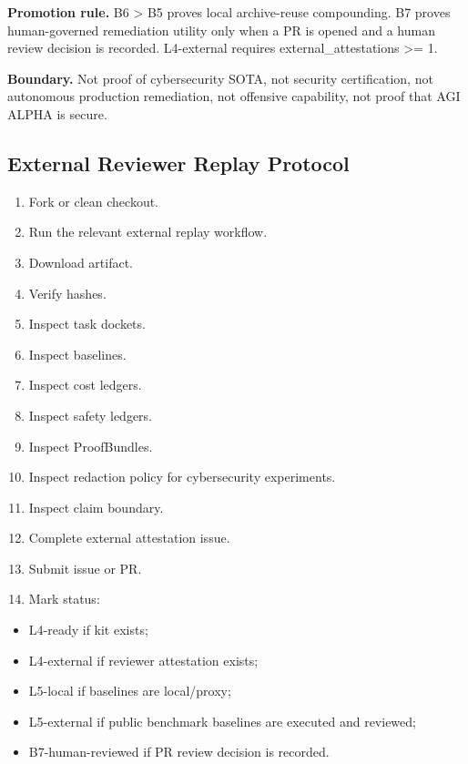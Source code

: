 \textbf{Promotion rule.} B6 \textgreater{} B5 proves local archive-reuse
compounding. B7 proves human-governed remediation utility only when a PR
is opened and a human review decision is recorded. L4-external requires
external\_attestations \textgreater= 1.

\textbf{Boundary.} Not proof of cybersecurity SOTA, not security
certification, not autonomous production remediation, not offensive
capability, not proof that AGI ALPHA is secure.

\subsection{External Reviewer Replay
Protocol}\label{external-reviewer-replay-protocol}

\begin{enumerate}
\def\labelenumi{\arabic{enumi}.}
\tightlist
\item
  Fork or clean checkout.
\item
  Run the relevant external replay workflow.
\item
  Download artifact.
\item
  Verify hashes.
\item
  Inspect task dockets.
\item
  Inspect baselines.
\item
  Inspect cost ledgers.
\item
  Inspect safety ledgers.
\item
  Inspect ProofBundles.
\item
  Inspect redaction policy for cybersecurity experiments.
\item
  Inspect claim boundary.
\item
  Complete external attestation issue.
\item
  Submit issue or PR.
\item
  Mark status:
\end{enumerate}

\begin{itemize}
\tightlist
\item
  L4-ready if kit exists;
\item
  L4-external if reviewer attestation exists;
\item
  L5-local if baselines are local/proxy;
\item
  L5-external if public benchmark baselines are executed and reviewed;
\item
  B7-human-reviewed if PR review decision is recorded.
\end{itemize}

